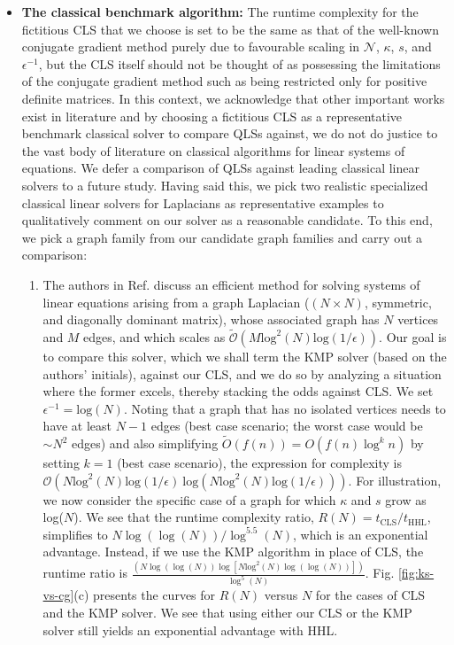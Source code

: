 \documentclass[%
 reprint,
 superscriptaddress,
 amsmath,amssymb,
 aps,
 pra,
floatfix,
nofootinbib,
]{revtex4-2}
\theoremstyle{definition}
\theoremstyle{remark}
\begin{document}
\begin{appendix}
\begin{itemize}
\item \textbf{The classical benchmark algorithm: }The runtime complexity for the fictitious CLS that we choose is set to be the same as that of the well-known conjugate gradient method purely due to favourable scaling in $\mathcal{N}$, $\kappa$, $s$, and $\epsilon^{-1}$, but the CLS itself should not be thought of as possessing the limitations of the conjugate gradient method such as being restricted only for positive definite matrices. In this context, we acknowledge that other important works exist in literature and by choosing a fictitious CLS as a representative benchmark classical solver to compare QLSs against, we do not do justice to the vast body of literature on classical algorithms for linear systems of equations. We defer a comparison of QLSs against leading classical linear solvers to a future study. Having said this, we pick two realistic specialized classical linear solvers for Laplacians as representative examples to qualitatively comment on our solver as a reasonable candidate. To this end, we pick a graph family from our candidate graph families and carry out a comparison: 
\begin{enumerate} 
\item The authors in Ref.\cite{koutis2014approaching} discuss an efficient method for solving systems of linear equations arising from a graph Laplacian ($(N\times N)$, symmetric, and diagonally dominant matrix), whose associated graph has $N$ vertices and $M$ edges, and which scales as $\mathcal{\tilde{O}}(M \mathrm{log}^2(N)\mathrm{log}(1/\epsilon))$. Our goal is to compare this solver, which we shall term the KMP solver (based on the authors' initials), against our CLS, and we do so by analyzing a situation where the former excels, thereby stacking the odds against CLS. We set $\epsilon^{-1}=\mathrm{log}(N)$. Noting that a graph that has no isolated vertices needs to have at least $N-1$ edges (best case scenario; the worst case would be $\sim N^2$ edges) and also simplifying $\widetilde{O}(f(n)) = O(f(n)  \log^k n)
$ by setting $k=1$ (best case scenario), the expression for complexity is $\mathcal{O}(N \mathrm{log}^2(N)\mathrm{log}(1/\epsilon) \ \mathrm{log}(N \mathrm{log}^2(N)\mathrm{log}(1/\epsilon)))$. For illustration, we now consider the specific case of a graph for which $\kappa$ and $s$ grow as log($N$). We see that the runtime complexity ratio, $R(N)=t_{\mathrm{CLS}}/t_{\mathrm{HHL}}$, simplifies to $N\log(\log(N))/\log^{5.5}(N)$, which is an exponential advantage. Instead, if we use the KMP algorithm in place of CLS, the runtime ratio is $\frac{(N\log(\log(N))\log[N \mathrm{log}^2(N) \log(\log(N))])}{\log^{5}(N)}$. Fig. \ref{fig:ks-vs-cg}(c) presents the curves for ${R}(N)$ versus $N$ for the cases of CLS and the KMP solver. We see that using either our CLS or the KMP solver still yields an exponential advantage with HHL. 


\end{enumerate}
\end{itemize}
\end{appendix}
\end{document}

